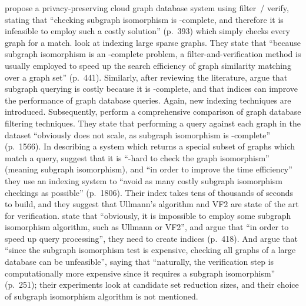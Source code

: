 \documentclass[twoside,11pt]{article}
\begin{document}
 propose a privacy-preserving cloud graph database system using
filter~/ verify, stating that ``checking subgraph isomorphism is \NP-complete, and therefore it is
infeasible to employ such a costly solution'' (p.\ 393) which simply checks every graph for a match.
 look at indexing large sparse graphs. They state that ``because
subgraph isomorphism is an \NP-complete problem, a filter-and-verification method is usually
employed to speed up the search efficiency of graph similarity matching over a graph set'' (p.\ 441).
Similarly, after reviewing the literature,  argue that subgraph
querying is costly because it is \NP-complete, and that indices can improve the performance of graph
database queries. Again, new indexing techniques are introduced. Subsequently,
 perform a comprehensive comparison of graph database
filtering techniques. They state that performing a query against each graph in the dataset
``obviously does not scale, as subgraph isomorphism is \NP-complete'' (p.\ 1566). In describing a
system which returns a special subset of graphs which match a query,
 suggest that it is ``\NP-hard to check the graph
isomorphism'' (meaning subgraph isomorphism), and ``in order to improve the time efficiency'' they
use an indexing system to ``avoid as many costly subgraph isomorphism checkings as possible'' (p.\
1806). Their index takes tens of thousands of seconds to build, and they suggest that Ullmann's
algorithm and VF2 are state of the art for verification.  \citeA{DBLP:journals/www/PengZ0LZ16} state
that ``obviously, it is impossible to employ some subgraph isomorphism algorithm, such as Ullmann or
VF2'', and argue that ``in order to speed up query processing'', they need to create indices (p.\
418).  And  argue that ``since the subgraph isomorphism test is expensive,
checking all graphs of a large database can be unfeasible'', saying that ``naturally, the
verification step is computationally more expensive since it requires a subgraph isomorphism'' (p.\
251); their experiments look at candidate set reduction sizes, and their choice of subgraph isomorphism
algorithm is not mentioned.
\end{document}

